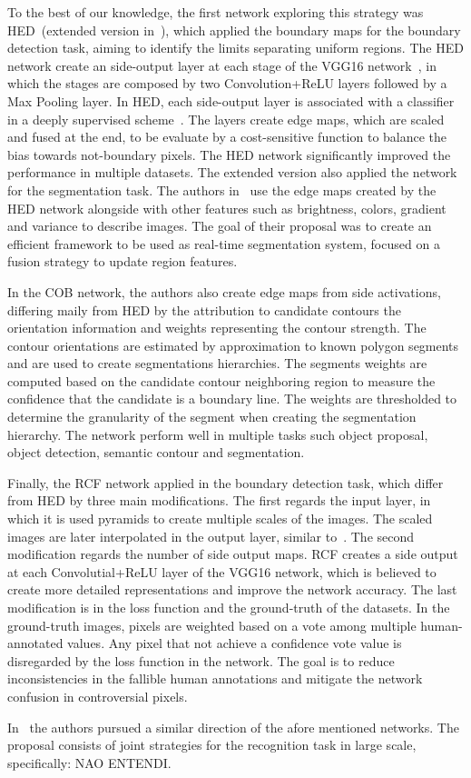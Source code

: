 To the best of our knowledge, the first network exploring this strategy was HED~(extended version in~\cite{xie2017}), which applied the boundary maps for the boundary detection task, aiming to identify the limits separating uniform regions. The HED network create an side-output layer at each stage of the VGG16 network~\cite{simonyan2014}, in which the stages are composed by two Convolution+ReLU layers followed by a Max Pooling layer. In HED, each side-output layer is associated with a classifier in a deeply supervised scheme~\cite{lee2015}. The layers create edge maps, which are scaled and fused at the end, to be evaluate by a cost-sensitive function to balance the bias towards not-boundary pixels. The HED network significantly improved the performance in multiple datasets. The extended version also applied the network for the segmentation task. The authors in~\cite{cheng2016} use the edge maps created by the HED network alongside with other features such as brightness, colors, gradient and variance to describe images. The goal of their proposal was to create an efficient framework to be used as real-time segmentation system, focused on a fusion strategy to update region features.


In the COB network, the authors also create edge maps from side activations, differing maily from HED by the attribution to candidate contours the orientation information and weights representing the contour strength. The contour orientations are estimated by approximation to known polygon segments and are used to create segmentations hierarchies. The segments weights are computed based on the candidate contour neighboring region to measure the confidence that the candidate is a boundary line. The weights are thresholded to determine the granularity of the segment when creating the segmentation hierarchy. The network perform well in multiple tasks such object proposal, object detection, semantic contour and segmentation.


Finally, the RCF network applied in the boundary detection task, which differ from HED by three main modifications. The first regards the input layer, in which it is used pyramids to create multiple scales of the images. The scaled images are later interpolated in the output layer, similar to~\cite{farabet2012}. The second modification regards the number of side output maps. RCF creates a side output at each Convolutial+ReLU layer of the VGG16 network, which is believed to create more detailed representations and improve the network accuracy. The last modification is in the loss function and the ground-truth of the datasets. In the ground-truth images, pixels are weighted based on a vote among multiple human-annotated values. Any pixel that not achieve a confidence vote value is disregarded by the loss function in the network. The goal is to reduce inconsistencies in the fallible human annotations and mitigate the network confusion in controversial pixels.  

In~\cite{fan2017} the authors pursued a similar direction of the afore mentioned networks. The proposal consists of joint strategies for the recognition task in large scale, specifically:  {\color{green} NAO ENTENDI}.
 